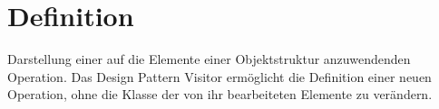 \section{Definition}
\glqq Darstellung einer auf die Elemente einer Objektstruktur anzuwendenden Operation. Das Design Pattern Visitor ermöglicht die Definition einer neuen Operation, ohne die Klasse der von ihr bearbeiteten Elemente zu verändern.\grqq